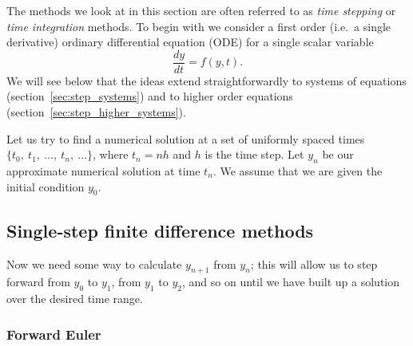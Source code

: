 The methods we look at in this section are often referred to as
\textit{time stepping} or \textit{time integration} methods.
To begin with we consider a first order (i.e.\ a single derivative)
ordinary differential equation (ODE) for a single scalar variable
\begin{equation}
\label{eq:ODE1}
\frac{d y}{d t} = f(y,t) .
\end{equation}
We will see below that the ideas extend straightforwardly to systems of
equations (section~\ref{sec:step_systems}) and to higher order
equations (section~\ref{sec:step_higher_systems}).

Let us try to find a numerical solution at a set of uniformly spaced times
$\{ t_0,\ t_1,\ \ldots,\ t_n,\ \ldots \}$, where $t_n = nh$ and $h$ is the
time step. Let $y_n$ be our approximate numerical solution at time $t_n$.
We assume that we are given the initial condition $y_0$.


\subsection{Single-step finite difference methods}

Now we need some way to calculate $y_{n+1}$ from $y_n$; this will allow us
to step forward from $y_0$ to $y_1$, from $y_1$ to $y_2$, and so on until
we have built up a solution over the desired time range.


\subsubsection{Forward Euler}












